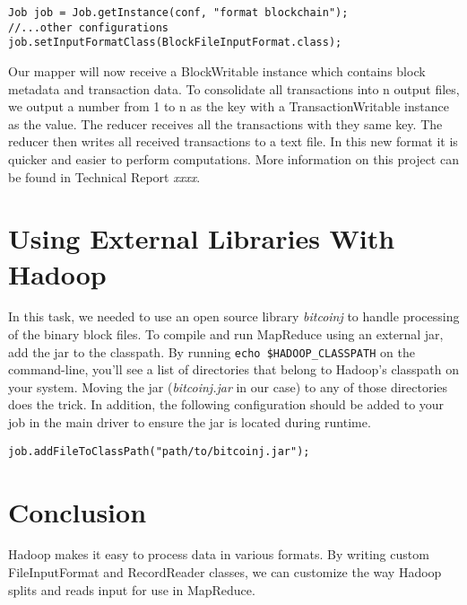 \documentclass[9pt,twocolumn,twoside]{idsi}
\begin{document}
\begin{lstlisting}
Job job = Job.getInstance(conf, "format blockchain");
//...other configurations
job.setInputFormatClass(BlockFileInputFormat.class);
\end{lstlisting}

Our mapper will now receive a BlockWritable instance which contains block metadata and transaction data. To consolidate all transactions into n output files, we output a number from 1 to n as the key with a TransactionWritable instance as the value. The reducer receives all the transactions with they same key. The reducer then writes all received transactions to a text file. In this new format it is quicker and easier to perform computations. More information on this project can be found in Technical Report \emph{xxxx}.

\section{Using External Libraries With Hadoop}

In this task, we needed to use an open source library \emph{bitcoinj} to handle processing of the binary block files. To compile and run MapReduce using an external jar, add the jar to the classpath. By running \lstinline{echo $HADOOP_CLASSPATH} on the command-line, you'll see a list of directories that belong to Hadoop's classpath on your system. Moving the jar (\emph{bitcoinj.jar} in our case) to any of those directories does the trick. In addition, the following configuration should be added to your job in the main driver to ensure the jar is located during runtime.

\begin{lstlisting}
job.addFileToClassPath("path/to/bitcoinj.jar");
\end{lstlisting}

\section{Conclusion}
Hadoop makes it easy to process data in various formats. By writing custom FileInputFormat and RecordReader classes, we can customize the way Hadoop splits and reads input for use in MapReduce.
\end{document}
